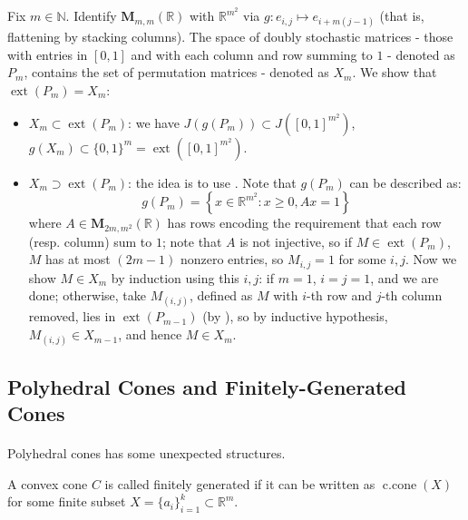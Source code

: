 \begin{exmp}
	Fix $m\in \mathbb{N}$. Identify $\mathbf{M}_{m,m}(\mathbb{R})$ with $\mathbb{R}^{m^2}$ via $g:e_{i,j}\mapsto e_{i+m(j-1)}$ (that is, flattening by stacking columns). The space of doubly stochastic matrices - those with entries in $[0,1]$ and with each column and row summing to $1$ - denoted as $P_{m}$, contains the set of permutation matrices - denoted as $X_m$. We show that $\operatorname{ext}(P_m)=X_m$:
	\begin{itemize}
		\item $X_m\subset \operatorname{ext}(P_m)$: we have $J(g(P_m))\subset J\left([0,1]^{m^2}\right)$, $g(X_m)\subset \{0,1\}^m=\operatorname{ext}\left([0,1]^{m^2}\right)$.
		\item $X_m\supset \operatorname{ext}(P_m)$: the idea is to use . Note that $g(P_m)$ can be described as:
		      \[
			      g(P_m)=\left\{
			      x\in \mathbb{R}^{m^2}:x\geq 0,Ax=1
			      \right\}
		      \]
		      where $A\in \mathbf{M}_{2m,m^2}(\mathbb{R})$ has rows encoding the requirement that each row (resp. column) sum to $1$; note that $A$ is not injective, so if $M\in \operatorname{ext}(P_m)$, $M$ has at most $(2m-1)$ nonzero entries, so $M_{i,j}=1$ for some $i,j$. Now we show $M\in X_m$ by induction using this $i,j$: if $m=1$, $i=j=1$, and we are done; otherwise, take $M_{(i,j)}$, defined as $M$ with $i$-th row and $j$-th column removed, lies in $\operatorname{ext}(P_{m-1})$ (by ), so by inductive hypothesis, $M_{(i,j)}\in X_{m-1}$, and hence $M\in X_m$.
	\end{itemize}
\end{exmp}

\subsection{Polyhedral Cones and Finitely-Generated Cones}

\paragraph{}Polyhedral cones has some unexpected structures.

\begin{defn}\label{defn:017-fg-cones}
	A convex cone $C$ is called finitely generated if it can be written as $\operatorname{c.cone}(X)$ for some finite subset $X=\{a_i\}_{i=1}^k\subset \mathbb{R}^m$.
\end{defn}

